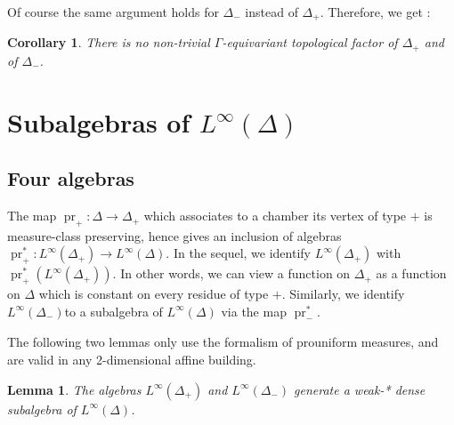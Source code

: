 \documentclass[a4paper, 11pt]{article}
\theoremstyle{plain}
\newtheorem{lemma}[proposition]{Lemma}
\newtheorem{corollary}[proposition]{Corollary}
\theoremstyle{definition}
\theoremstyle{remark}
\DeclareMathOperator{\pr}{pr}
\begin{document}
Of course the same argument holds for $\Delta_-$ instead of $\Delta_+$. Therefore, we get :

\begin{corollary}\label{cor:FactorTop}
There is no non-trivial $\Gamma$-equivariant \emph{topological} factor of $\Delta_+$ and of $\Delta_-$.
\end{corollary}




\section{Subalgebras of $L^\infty(\Delta)$}

\subsection{Four algebras}

The map $\pr_+:\Delta\to \Delta_+$ which associates to a chamber its vertex of type $+$ is measure-class preserving, hence gives an inclusion of algebras $\pr_+^*:L^\infty(\Delta_+)\to L^\infty(\Delta)$. In the sequel, we identify $L^\infty(\Delta_+)$ with $\pr_+^*(L^\infty(\Delta_+))$. In other words, we can view a function on $\Delta_+$ as a function on $\Delta$ which is constant on every residue of type $+$.
 Similarly, we identify $L^\infty(\Delta_-)$to a subalgebra of $L^\infty(\Delta)$ via the map $\pr_-^*$.

The following two lemmas only use the formalism of prouniform measures, and are valid in any 2-dimensional affine building.

\begin{lemma}\label{lem:join}
The algebras $L^\infty(\Delta_+)$ and $L^\infty(\Delta_-)$ generate a weak-* dense subalgebra of $L^\infty(\Delta)$.
\end{lemma}
\end{document}
